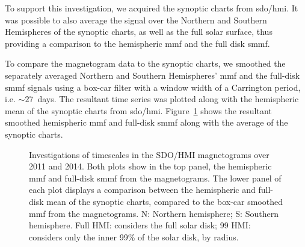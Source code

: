 To support this investigation, we acquired the synoptic charts from \gls{sdo/hmi}. It was possible to also average the signal over the Northern and Southern Hemispheres of the synoptic charts, as well as the full solar surface, thus providing a comparison to the hemispheric \gls{mmf} and the full disk \gls{smmf}.

To compare the magnetogram data to the synoptic charts, we smoothed the separately averaged Northern and Southern Hemispheres' \gls{mmf} and the full-disk \gls{smmf} signals using a box-car filter with a window width of a Carrington period, i.e. $\sim 27$~days. The resultant time series was plotted along with the hemispheric mean of the synoptic charts from \gls{sdo/hmi}. Figure~\ref{fig:HMI_MF_vs_synoptics} shows the resultant smoothed hemispheric \gls{mmf} and full-disk \gls{smmf} along with the average of the synoptic charts.

\begin{figure}[!ht]
	\centering
	\qquad
	\caption{Investigations of timescales in the SDO/HMI magnetograms over 2011 and 2014. Both plots show in the top panel, the hemispheric \gls{mmf} and full-disk \gls{smmf} from the magnetograms. The lower panel of each plot displays a comparison between the hemispheric and full-disk mean of the synoptic charts, compared to the box-car smoothed \gls{mmf} from the magnetograms. N: Northern hemisphere; S: Southern hemisphere. Full HMI: considers the full solar disk; 99 HMI: considers only the inner 99\% of the solar disk, by radius.}
	\label{fig:HMI_MF_vs_synoptics}
\end{figure}

